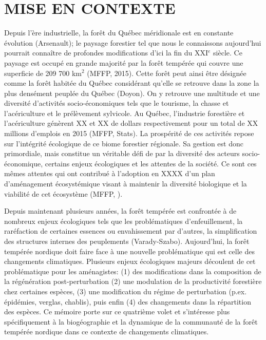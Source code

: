 
\section*{\uppercase{Mise en contexte}}

Depuis l'ère industrielle, la forêt du Québec méridionale est en constante évolution (Arsenault); le paysage forestier tel que nous le connaissons aujourd'hui pourrait connaître de profondes modifications d'ici la fin du XXI$^e$ siècle. Ce paysage est occupé en grande majorité par la forêt tempérée qui couvre une superficie de 209 700 km$^2$ (MFFP, 2015). Cette forêt peut ainsi être désignée comme la forêt habitée du Québec considérant qu'elle se retrouve dans la zone la plus densément peuplée du Québec (Doyon). On y retrouve une multitude et une diversité d'activités socio-économiques tels que le tourisme, la chasse et l'acériculture et le prélèvement sylvicole. Au Québec, l'industrie forestière et l'acériculture génèrent XX et XX de dollars respectivement pour un total de XX millions d'emplois en 2015 (MFFP, Stats). La prospérité de ces activités repose sur l'intégrité écologique de ce biome forestier régionale. Sa gestion est donc primordiale, mais constitue un véritable défi de par la diversité des acteurs socio-économique, certains enjeux écologiques et les attentes de la société. Ce sont ces mêmes attentes qui ont contribué à l'adoption en XXXX d'un plan d'aménagement écosystémique visant à maintenir la diversité biologique et la viabilité de cet écosystème (MFFP, ).

Depuis maintenant plusieurs années, la forêt tempérée est confrontée à de nombreux enjeux écologiques tels que les problématiques d'enfeuillement, la raréfaction de certaines essences ou envahissement par d’autres, la simplification des structures internes des peuplements (Varady-Szabo). Aujourd'hui, la forêt tempérée nordique doit faire face à une nouvelle problématique qui est celle des changements climatiques. Plusieurs enjeux écologiques majeurs découlent de cet problématique pour les aménagistes: (1) des modifications dans la composition de la régénération post-perturbation (2) une modulation de la productivité forestière chez certaines espèces, (3) une modification du régime de perturbation (p.ex. épidémies, verglas, chablis), puis enfin (4) des changements dans la répartition des espèces. Ce mémoire porte sur ce quatrième volet et s'intéresse plus spécifiquement à la biogéographie et la dynamique de la communauté de la forêt tempérée nordique dans ce contexte de changements climatiques.

